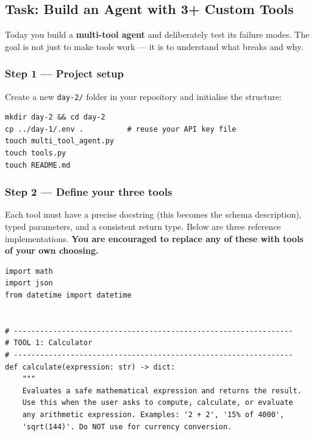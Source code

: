 \documentclass[12pt, a4paper]{article}
\begin{document}
\begin{practicalbox}

\subsection*{Task: Build an Agent with 3+ Custom Tools}

Today you build a \textbf{multi-tool agent} and deliberately test its failure modes. The goal is not just to make tools work --- it is to understand what breaks and why.

\subsubsection*{Step 1 --- Project setup}

Create a new \texttt{day-2/} folder in your repository and initialise the structure:

\begin{lstlisting}[style=bashstyle]
mkdir day-2 && cd day-2
cp ../day-1/.env .          # reuse your API key file
touch multi_tool_agent.py
touch tools.py
touch README.md
\end{lstlisting}

\subsubsection*{Step 2 --- Define your three tools}

Each tool must have a precise docstring (this becomes the schema description), typed parameters, and a consistent return type. Below are three reference implementations. \textbf{You are encouraged to replace any of these with tools of your own choosing.}

\begin{lstlisting}[style=pythonstyle, caption={tools.py --- three custom tools with typed schemas}]
import math
import json
from datetime import datetime


# ----------------------------------------------------------------
# TOOL 1: Calculator
# ----------------------------------------------------------------
def calculate(expression: str) -> dict:
    """
    Evaluates a safe mathematical expression and returns the result.
    Use this when the user asks to compute, calculate, or evaluate
    any arithmetic expression. Examples: '2 + 2', '15% of 4000',
    'sqrt(144)'. Do NOT use for currency conversion.


\end{lstlisting}
\end{practicalbox}
\end{document}
